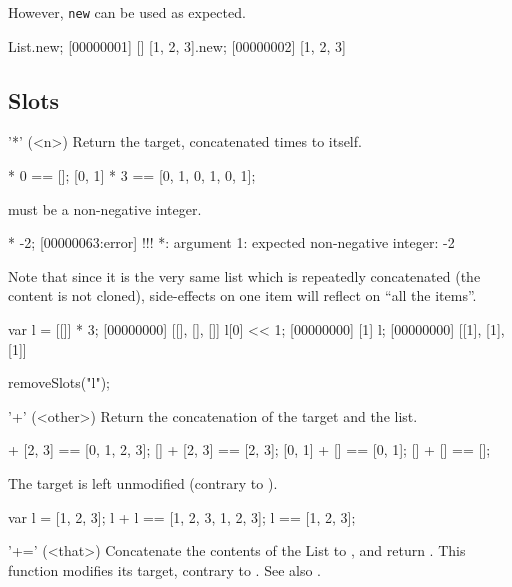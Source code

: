 However, \lstinline|new| can be used as expected.

\begin{urbiscript}
List.new;
[00000001] []
[1, 2, 3].new;
[00000002] [1, 2, 3]
\end{urbiscript}

\subsection{Slots}

\begin{urbiscriptapi}
\item['*'](<n>)%
  Return the target, concatenated  times to itself.
\begin{urbiassert}
[0, 1] * 0 == [];
[0, 1] * 3 == [0, 1, 0, 1, 0, 1];
\end{urbiassert}

   must be a non-negative integer.

\begin{urbiscript}
[0, 1] * -2;
[00000063:error] !!! *: argument 1: expected non-negative integer: -2
\end{urbiscript}


  Note that since it is the very same list which is repeatedly
  concatenated (the content is not cloned), side-effects on one item
  will reflect on ``all the items''.

\begin{urbiscript}
var l = [[]] * 3;
[00000000] [[], [], []]
l[0] << 1;
[00000000] [1]
l;
[00000000] [[1], [1], [1]]
\end{urbiscript}
\begin{urbicomment}
removeSlots("l");
\end{urbicomment}


\item['+'](<other>)%
  Return the concatenation of the target and the  list.

\begin{urbiassert}
[0, 1] + [2, 3] == [0, 1, 2, 3];
    [] + [2, 3] == [2, 3];
[0, 1] + []     == [0, 1];
    [] + []     == [];
\end{urbiassert}

The target is left unmodified (contrary to ).
\begin{urbiassert}
var l = [1, 2, 3];
l + l == [1, 2, 3, 1, 2, 3];
l     == [1, 2, 3];
\end{urbiassert}


\item['+='](<that>)%
  Concatenate the contents of the List  to \this, and return
  \this.  This function modifies its target, contrary to .  See
  also .


\end{urbiscriptapi}
